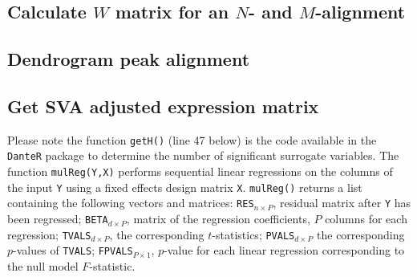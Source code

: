 \documentclass[12pt,a4paper,oneside]{report}
\begin{document}
\begin{appendix}

\subsection{Calculate $W$ matrix for an $N$- and $M$-alignment} 


\subsection{Dendrogram peak alignment} 






\subsection{Get SVA adjusted expression matrix}
Please note the function \texttt{getH()} (line 47 below) is the code available in the \texttt{DanteR} package to determine the number of significant surrogate variables. The function \texttt{mulReg(Y,X)} performs sequential linear regressions on the columns of the input \texttt{Y} using a fixed effects design matrix \texttt{X}. \texttt{mulReg()} returns a list containing the following vectors and matrices: \texttt{RES}$_{n \times P}$, residual matrix after \texttt{Y} has been regressed; \texttt{BETA}$_{d \times P}$, matrix of the regression coefficients, $P$ columns for each regression; \texttt{TVALS}$_{d \times P}$, the corresponding $t$-statistics; \texttt{PVALS}$_{d \times P}$ the corresponding $p$-values of \texttt{TVALS}; \texttt{FPVALS}$_{P\times 1}$, $p$-value for each linear regression corresponding to the null model $F$-statistic.\\






\end{appendix}
\end{document}
